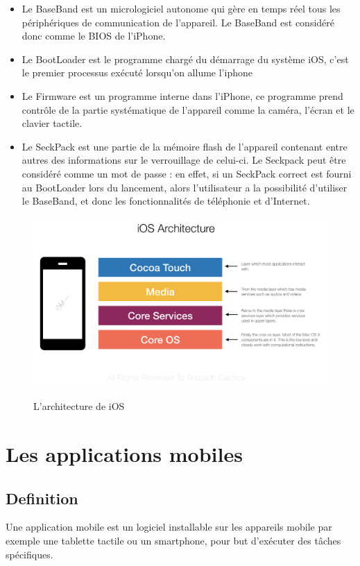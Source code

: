 \begin{itemize}
    \item Le BaseBand est un micrologiciel autonome qui gère en temps réel tous les périphériques de communication de l'appareil. Le BaseBand est considéré donc comme le BIOS de l'iPhone.
    \item Le BootLoader est le programme chargé du démarrage du système iOS, c'est le premier processus exécuté lorsqu'on allume l'iphone 
    \item Le Firmware est un programme interne dans l'iPhone, ce programme prend contrôle de la partie systématique de l'appareil comme la caméra, l'écran et le clavier tactile. 
    \item Le SeckPack est une partie de la mémoire flash de l'appareil contenant entre autres des informations sur le verrouillage de celui-ci. Le Seckpack peut être considéré comme un mot de passe : en effet, si un SeckPack correct est fourni au BootLoader lors du lancement, alors l'utilisateur a la possibilité d'utiliser le BaseBand, et donc les fonctionnalités de téléphonie et d'Internet.~\cite{IOS2020}
\end{itemize}

\begin{figure}[!ht]
    \centering
    \includegraphics[width=6in]{images/Chapitre1/ios_architecture.png}
    \label{fig:ios Ui}
    \caption{L'architecture de iOS}
\end{figure}

\newpage
\section{Les applications mobiles}
\subsection{Definition}
Une application mobile est un logiciel installable sur les appareils mobile par exemple une tablette tactile ou un smartphone, pour but d'exécuter des tâches spécifiques.

